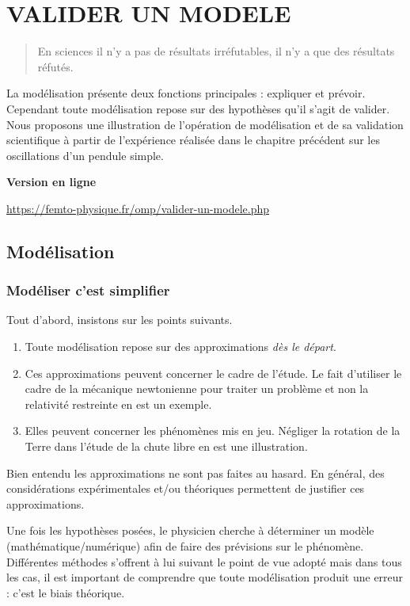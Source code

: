 \setchapterpreamble[u]{\margintoc}
\chapter{VALIDER UN MODELE}

\blockquote{En sciences il n'y a pas de résultats irréfutables, il  n'y a que des résultats réfutés.}

La modélisation présente deux fonctions principales : expliquer et prévoir. Cependant toute modélisation repose sur des hypothèses qu'il s'agit de valider. Nous proposons une illustration de l'opération de modélisation et de sa validation scientifique à partir de l'expérience réalisée dans le chapitre précédent sur les oscillations d'un pendule simple. 

\begin{center}
\textbf{Version en ligne}

	\url{https://femto-physique.fr/omp/valider-un-modele.php}
\end{center}


\section{Modélisation}
 
\subsection{Modéliser c'est simplifier}
Tout d'abord, insistons sur les points suivants.
\begin{enumerate}
	\item Toute modélisation repose sur des approximations \emph{dès le départ}.
	\item Ces approximations peuvent concerner le cadre de l'étude. Le fait d'utiliser le cadre de la mécanique newtonienne pour traiter un problème et non la relativité restreinte en est un exemple.
	\item Elles peuvent concerner les phénomènes mis en jeu. Négliger la rotation de la Terre dans l'étude de la chute libre en est une illustration.
\end{enumerate}

Bien entendu les approximations ne sont pas faites au hasard. En général, des considérations expérimentales et/ou théoriques permettent de justifier ces approximations. 

Une fois les hypothèses posées, le physicien cherche à déterminer un modèle (mathématique/numérique) afin de faire des prévisions sur le phénomène. Différentes méthodes s'offrent à lui suivant le point de vue adopté mais dans tous les cas, il est important de comprendre que toute modélisation produit une erreur : c'est le biais théorique.

